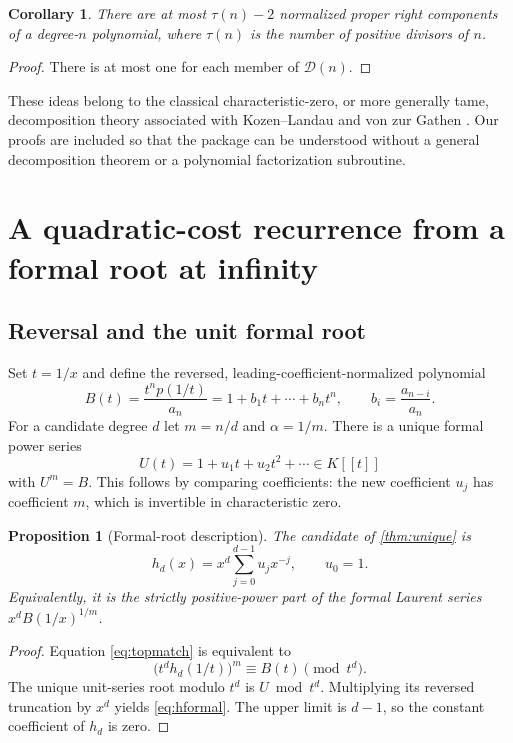 \documentclass[11pt,a4paper]{article}
\newtheorem{proposition}[theorem]{Proposition}
\newtheorem{corollary}[theorem]{Corollary}
\theoremstyle{definition}
\newcommand{\calD}{\mathcal D}
\begin{document}
\begin{corollary}\label{cor:pairsbound}
There are at most $\tau(n)-2$ normalized proper right components of a degree-$n$ polynomial, where $\tau(n)$ is the number of positive divisors of $n$.
\end{corollary}
\begin{proof}
There is at most one for each member of $\calD(n)$.
\end{proof}

These ideas belong to the classical characteristic-zero, or more generally tame, decomposition theory associated with Kozen--Landau and von zur Gathen \cite{kozenlandau,gathen}. Our proofs are included so that the package can be understood without a general decomposition theorem or a polynomial factorization subroutine.

\section{A quadratic-cost recurrence from a formal root at infinity}
\subsection{Reversal and the unit formal root}
Set $t=1/x$ and define the reversed, leading-coefficient-normalized polynomial
\begin{equation}
 B(t)=\frac{t^n p(1/t)}{a_n}
      =1+b_1t+\cdots+b_nt^n,\qquad b_i=\frac{a_{n-i}}{a_n}.\label{eq:reversal}
\end{equation}
For a candidate degree $d$ let $m=n/d$ and $\alpha=1/m$. There is a unique formal power series
\[
 U(t)=1+u_1t+u_2t^2+\cdots\in K[[t]]
\]
with $U^m=B$. This follows by comparing coefficients: the new coefficient $u_j$ has coefficient $m$, which is invertible in characteristic zero.

\begin{proposition}[Formal-root description]\label{prop:formalroot}
The candidate of \cref{thm:unique} is
\begin{equation}
 h_d(x)=x^d\sum_{j=0}^{d-1}u_jx^{-j},\qquad u_0=1.\label{eq:hformal}
\end{equation}
Equivalently, it is the strictly positive-power part of the formal Laurent series $x^dB(1/x)^{1/m}$.
\end{proposition}
\begin{proof}
Equation \eqref{eq:topmatch} is equivalent to
\[
 \bigl(t^d h_d(1/t)\bigr)^m\equiv B(t)\pmod{t^d}.
\]
The unique unit-series root modulo $t^d$ is $U\bmod t^d$. Multiplying its reversed truncation by $x^d$ yields \eqref{eq:hformal}. The upper limit is $d-1$, so the constant coefficient of $h_d$ is zero.
\end{proof}
\end{document}
